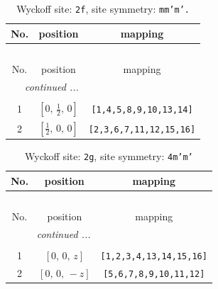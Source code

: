 \documentclass[fleqn,8pt]{jsarticle}
\begin{document}
\renewcommand{\arraystretch}{1.2}
\begin{longtable}{ccc}
\caption{Wyckoff site: {\tt 2f}, site symmetry: {\tt mm'm'.}}
 \\
 \hline \hline
No. & position & mapping \\ \hline \endfirsthead

\multicolumn{2}{l}{\tablename\ \thetable{}} \\
 \hline \hline
No. & position & mapping \\ \hline \endhead

 \hline \hline
\multicolumn{2}{r}{\footnotesize\it continued ...} \\ \endfoot

 \hline \hline
\multicolumn{2}{r}{} \\ \endlastfoot

1 & $\left[ 0,\, \frac{1}{2},\, 0 \right]$ & {\tt [1,4,5,8,9,10,13,14]} \\ \hline
2 & $\left[ \frac{1}{2},\, 0,\, 0 \right]$ & {\tt [2,3,6,7,11,12,15,16]} \\
\end{longtable}
\renewcommand{\arraystretch}{1.2}
\begin{longtable}{ccc}
\caption{Wyckoff site: {\tt 2g}, site symmetry: {\tt 4m'm'}}
 \\
 \hline \hline
No. & position & mapping \\ \hline \endfirsthead

\multicolumn{2}{l}{\tablename\ \thetable{}} \\
 \hline \hline
No. & position & mapping \\ \hline \endhead

 \hline \hline
\multicolumn{2}{r}{\footnotesize\it continued ...} \\ \endfoot

 \hline \hline
\multicolumn{2}{r}{} \\ \endlastfoot

1 & $\left[ 0,\, 0,\, z \right]$ & {\tt [1,2,3,4,13,14,15,16]} \\ \hline
2 & $\left[ 0,\, 0,\, - z \right]$ & {\tt [5,6,7,8,9,10,11,12]} \\
\end{longtable}
\renewcommand{\arraystretch}{1.2}
\end{document}
